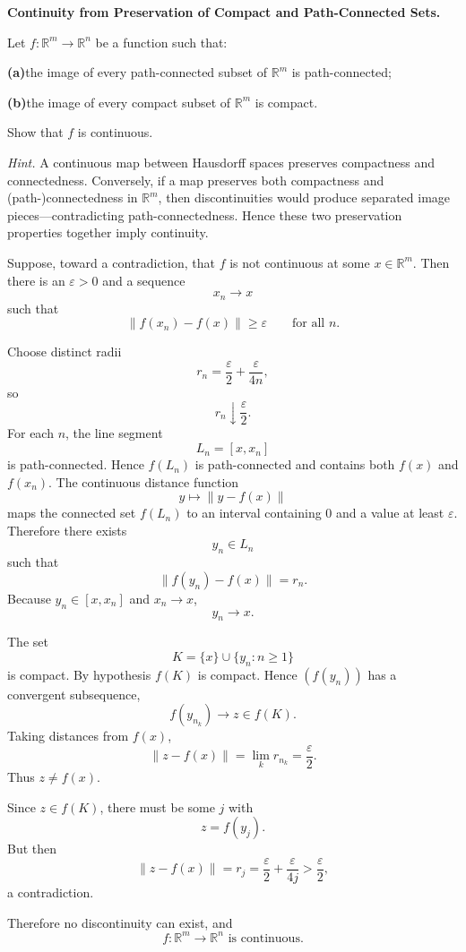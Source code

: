 \begin{problem}[CP-II-0191]
\label{prob:cp-ii-0191}
\textbf{Continuity from Preservation of Compact and Path-Connected Sets.}

\hspace*{1.5em}Let $f:\mathbb{R}^m\to\mathbb{R}^n$ be a function such that:

		\par\smallskip\noindent\textbf{(a)}\quad the image of every path-connected subset of $\mathbb{R}^m$ is path-connected;
		\par\smallskip\noindent\textbf{(b)}\quad the image of every compact subset of $\mathbb{R}^m$ is compact.

	Show that $f$ is continuous.


	\emph{Hint.} A continuous map between Hausdorff spaces preserves compactness and connectedness.
	Conversely, if a map preserves both compactness and (path-)connectedness in $\mathbb{R}^m$,
	then discontinuities would produce separated image pieces---contradicting path-connectedness.
	Hence these two preservation properties together imply continuity.

\end{problem}

\begin{solution}
Suppose, toward a contradiction, that \(f\) is not continuous at some \(x\in\mathbb R^m\). Then there is an \(\varepsilon>0\) and a sequence
\[
x_n\to x
\]
such that
\[
\|f(x_n)-f(x)\|\ge\varepsilon
\qquad\text{for all }n.
\]

Choose distinct radii
\[
r_n=\frac{\varepsilon}{2}+\frac{\varepsilon}{4n},
\]
so
\[
r_n\downarrow\frac{\varepsilon}{2}.
\]
For each \(n\), the line segment
\[
L_n=[x,x_n]
\]
is path-connected. Hence \(f(L_n)\) is path-connected and contains both \(f(x)\) and \(f(x_n)\). The continuous distance function
\[
y\longmapsto\|y-f(x)\|
\]
maps the connected set \(f(L_n)\) to an interval containing \(0\) and a value at least \(\varepsilon\). Therefore there exists
\[
y_n\in L_n
\]
such that
\[
\|f(y_n)-f(x)\|=r_n.
\]
Because \(y_n\in[x,x_n]\) and \(x_n\to x\),
\[
y_n\to x.
\]

The set
\[
K=\{x\}\cup\{y_n:n\ge1\}
\]
is compact. By hypothesis \(f(K)\) is compact. Hence \((f(y_n))\) has a convergent subsequence,
\[
f(y_{n_k})\to z\in f(K).
\]
Taking distances from \(f(x)\),
\[
\|z-f(x)\|
=
\lim_k r_{n_k}
=
\frac{\varepsilon}{2}.
\]
Thus \(z\neq f(x)\).

Since \(z\in f(K)\), there must be some \(j\) with
\[
z=f(y_j).
\]
But then
\[
\|z-f(x)\|
=
r_j
=
\frac{\varepsilon}{2}+\frac{\varepsilon}{4j}
>
\frac{\varepsilon}{2},
\]
a contradiction.

Therefore no discontinuity can exist, and
\[
\boxed{f:\mathbb R^m\to\mathbb R^n\text{ is continuous}.}
\]
\end{solution}


